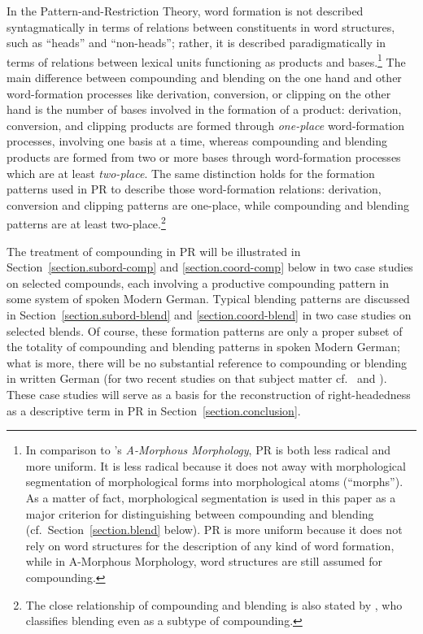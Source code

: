 \documentclass[output=paper
  ,nobabel
  ,draftmode
  ,colorlinks, citecolor=brown
]{langscibook}
\begin{document}
In the Pattern-and-Restriction Theory, word formation is not described
syntagmatically in terms of relations between constituents in word structures,
such as ``heads'' and ``non-heads''; rather,
it is described paradigmatically in terms of relations between lexical units
functioning as products and bases.\footnote{In comparison to \citeauthor{anderson:1992:a-morphous:morphology}’s \citeyearpar{anderson:1992:a-morphous:morphology} \emph{A-Morphous
Morphology}, PR is both less radical and more uniform. It is less radical
because it does not away with morphological segmentation of morphological forms
into morphological atoms (``morphs''). As a matter of fact,
morphological segmentation is used in this paper as a major criterion for
distinguishing between compounding and blending (cf.\ Section \ref{section.blend} below). PR is more uniform because it does not rely on
word structures for the description of any kind of word formation, while in
A-Morphous Morphology, word structures are still assumed for
compounding.} The main difference between compounding and
blending on the one hand and other word-formation processes like derivation,
conversion, or clipping on the other hand is the number of bases involved in the
formation of a product: derivation, conversion, and clipping products are formed
through \emph{one-place} word-formation processes, involving one basis at
a time, whereas compounding and blending products are formed from two or more
bases through word-formation processes which are at least
\emph{two-place}. The same distinction holds for the formation patterns
used in PR to describe those word-formation relations: derivation, conversion
and clipping patterns are one-place, while compounding and blending patterns are
at least two-place.\footnote{The close relationship of compounding and blending is
also stated by \citet[Chapter 4]{donalies:2002:wortbildung:deutschen}, who classifies
blending even as a subtype of compounding.}

\largerpage
The treatment of compounding in PR will be illustrated in Section \ref{section.subord-comp} and \ref{section.coord-comp} below in two case studies on selected compounds,
each involving a productive compounding pattern in some system of spoken Modern
German. Typical blending patterns are discussed in Section \ref{section.subord-blend} and \ref{section.coord-blend} in two case studies on selected blends. Of
course, these formation patterns are only a proper subset of the totality of
compounding and blending patterns in spoken Modern German; what is more, there
will be no substantial reference to compounding or blending in written German
(for two recent studies on that subject matter cf.\ \citealt{scherer:2013:schreibung:fenster} and \citealt{borgwaldt:2013:fugenelemente:bindestriche}). These case studies will
serve as a basis for the reconstruction of right-headedness as a descriptive
term in PR in Section \ref{section.conclusion}.
\end{document}
